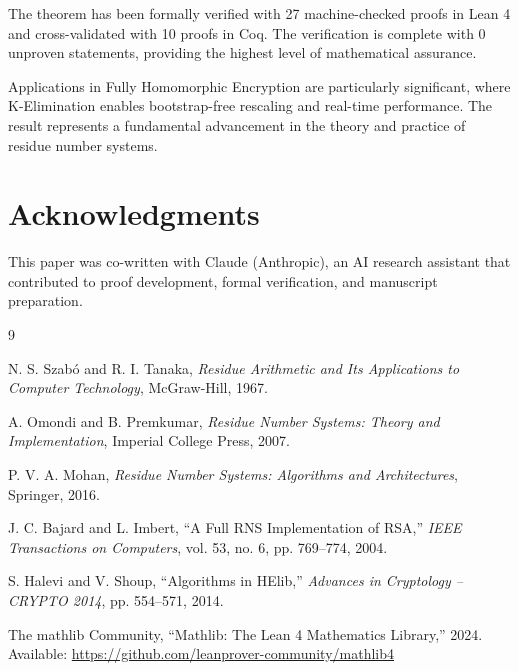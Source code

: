 \documentclass[11pt,a4paper]{article}
\begin{document}
The theorem has been formally verified with 27 machine-checked proofs in Lean 4 and cross-validated with 10 proofs in Coq. The verification is complete with 0 unproven statements, providing the highest level of mathematical assurance.

Applications in Fully Homomorphic Encryption are particularly significant, where K-Elimination enables bootstrap-free rescaling and real-time performance. The result represents a fundamental advancement in the theory and practice of residue number systems.

\section*{Acknowledgments}

This paper was co-written with Claude (Anthropic), an AI research assistant that contributed to proof development, formal verification, and manuscript preparation.

\begin{thebibliography}{9}

N. S. Szab\'{o} and R. I. Tanaka, \emph{Residue Arithmetic and Its Applications to Computer Technology}, McGraw-Hill, 1967.

A. Omondi and B. Premkumar, \emph{Residue Number Systems: Theory and Implementation}, Imperial College Press, 2007.

P. V. A. Mohan, \emph{Residue Number Systems: Algorithms and Architectures}, Springer, 2016.

J. C. Bajard and L. Imbert, ``A Full RNS Implementation of RSA,'' \emph{IEEE Transactions on Computers}, vol. 53, no. 6, pp. 769--774, 2004.

S. Halevi and V. Shoup, ``Algorithms in HElib,'' \emph{Advances in Cryptology -- CRYPTO 2014}, pp. 554--571, 2014.

The mathlib Community, ``Mathlib: The Lean 4 Mathematics Library,'' 2024. Available: \url{https://github.com/leanprover-community/mathlib4}

\end{thebibliography}
\end{document}
